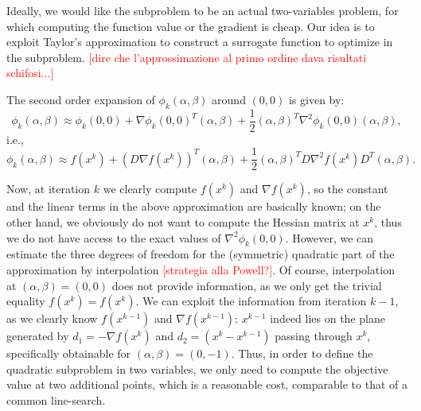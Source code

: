 \documentclass[a4paper, 11pt, openany]{article}
\theoremstyle{plain}%
\theoremstyle{definition}
\begin{document}
	Ideally, we would like the subproblem to be an actual two-variables problem, for which computing the function value or the gradient is cheap. Our idea is to exploit Taylor's approximation to construct a surrogate function to optimize in the subproblem. \textcolor{red}{[dire che l'approssimazione al primo ordine dava risultati schifosi...]}
	
	The second order expansion of $\phi_k(\alpha,\beta)$ around $(0,0)$ is given by:
	$$\phi_k(\alpha,\beta)\approx \phi_k(0,0) + \nabla \phi_k(0,0)^T(\alpha,\beta) + \frac{1}{2}(\alpha,\beta)^T\nabla^2\phi_k(0,0)(\alpha,\beta),$$
	i.e.,
	$$\phi_k(\alpha,\beta)\approx f(x^k) +  (D \nabla f(x^k))^T(\alpha,\beta) + \frac{1}{2}(\alpha,\beta)^T D \nabla^2f(x^k) D^T(\alpha,\beta).$$
	
	Now, at iteration $k$ we clearly compute $f(x^k)$ and $\nabla f(x^k)$, so the constant and the linear terms in the above approximation are basically known; on the other hand, we obviously do not want to compute the Hessian matrix at $x^k$, thus we do not have access to the exact values of $\nabla^2\phi_k(0,0)$. However, we can estimate the three degrees of freedom for the (symmetric) quadratic part of the approximation by interpolation \textcolor{red}{[strategia alla Powell?]}. Of course, interpolation at $(\alpha,\beta) = (0,0)$ does not provide information, as we only get the trivial equality $f(x^k) = f(x^k)$. We can exploit the information from iteration $k-1$, as we clearly know $f(x^{k-1})$ and $\nabla f(x^{k-1})$: $x^{k-1}$ indeed lies on the plane generated by $d_1=-\nabla f(x^k)$ and $d_2 = (x^k-x^{k-1})$ passing through $x^k$, specifically obtainable for $(\alpha,\beta) = (0,-1)$. 
	Thus, in order to define the quadratic subproblem in two variables, we only need to compute the objective value at two additional points, which is a reasonable cost, comparable to that of a common line-search. 
	
\end{document}
